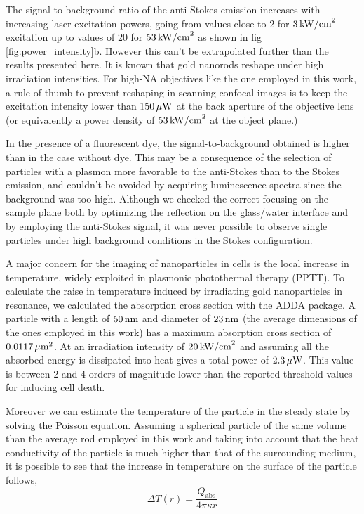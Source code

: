 The signal-to-background ratio of the anti-Stokes emission increases with
increasing laser excitation powers, going from values close to $2$ for $3\,\textrm{kW/cm}^2$
excitation up to values of $20$ for $53\,\textrm{kW/cm}^2$ as shown in fig
\ref{fig:power_intensity}b. However this can't be extrapolated further than the
results presented here. It is known that gold nanorods reshape under high
irradiation intensities\cite{Liu2009}. For high-NA objectives like the one
employed in this work, a rule of thumb to prevent reshaping in scanning confocal images is to
keep the excitation intensity lower than $150\,\mu\textrm{W}$ at the back aperture of the
objective lens (or equivalently a power density of $53\,\textrm{kW/cm}^2$ at the object
plane.)

In the presence of a fluorescent dye, the signal-to-background obtained is
higher than in the case without dye. This may be a consequence of the selection
of particles with a plasmon more favorable to the anti-Stokes than to the Stokes
emission, and couldn't be avoided by acquiring luminescence spectra since the
background was too high. Although we checked the correct focusing on the sample
plane both by optimizing the reflection on the glass/water interface and by
employing the anti-Stokes signal, it was never possible to observe single
particles under high background conditions in the Stokes configuration.

A major concern for the imaging of nanoparticles in cells is the local
increase in temperature, widely exploited in plasmonic photothermal therapy
(PPTT)\cite{Huang2008}. To calculate the raise in temperature induced by
irradiating gold nanoparticles in resonance, we calculated the absorption cross
section with the ADDA package\cite{Yurkin2011}. A particle with a length of
$50\,\textrm{nm}$ and diameter of $23\,\textrm{nm}$ (the average dimensions of the ones employed in
this work) has a maximum absorption cross section of $0.0117\,\mu\textrm{m}^2$. At an
irradiation intensity of $20\,\textrm{kW/cm}^2$ and assuming all the absorbed energy is
dissipated into heat gives a total power of $2.3\,\mu\textrm{W}$. This value is between
$2$ and $4$ orders of magnitude lower than the reported threshold values for
inducing cell death\cite{Huang2006a,Huang2006}.

Moreover we can estimate the temperature of the particle in the steady state by
solving the Poisson equation. Assuming a spherical particle of the same volume
than the average rod employed in this work and taking into account that the heat
conductivity of the particle is much higher than that of the surrounding medium,
it is possible to see that the increase in temperature on the surface of
the particle follows,
\begin{equation*}
	\Delta T(r) = \frac{Q_\textrm{abs}}{4\pi\kappa r}
\end{equation*}

